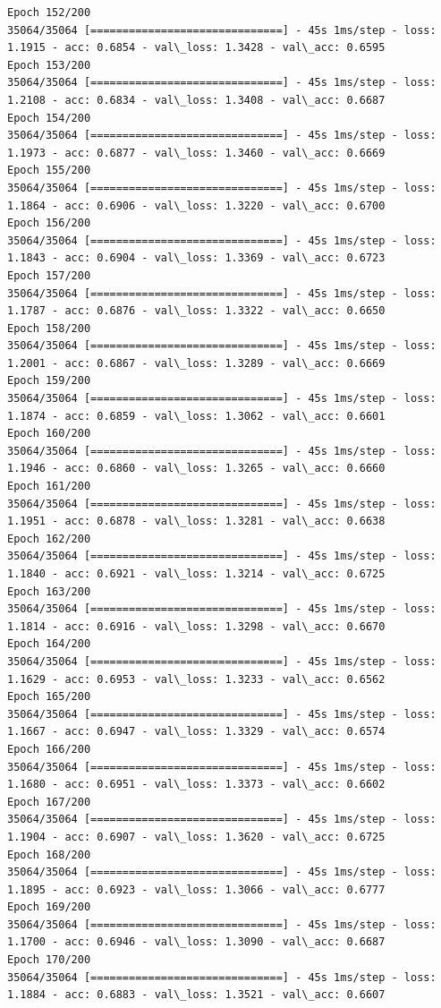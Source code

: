 \documentclass[11pt]{article}
\begin{document}
\begin{Verbatim}[commandchars=\\\{\}]
Epoch 152/200
35064/35064 [==============================] - 45s 1ms/step - loss: 1.1915 - acc: 0.6854 - val\_loss: 1.3428 - val\_acc: 0.6595
Epoch 153/200
35064/35064 [==============================] - 45s 1ms/step - loss: 1.2108 - acc: 0.6834 - val\_loss: 1.3408 - val\_acc: 0.6687
Epoch 154/200
35064/35064 [==============================] - 45s 1ms/step - loss: 1.1973 - acc: 0.6877 - val\_loss: 1.3460 - val\_acc: 0.6669
Epoch 155/200
35064/35064 [==============================] - 45s 1ms/step - loss: 1.1864 - acc: 0.6906 - val\_loss: 1.3220 - val\_acc: 0.6700
Epoch 156/200
35064/35064 [==============================] - 45s 1ms/step - loss: 1.1843 - acc: 0.6904 - val\_loss: 1.3369 - val\_acc: 0.6723
Epoch 157/200
35064/35064 [==============================] - 45s 1ms/step - loss: 1.1787 - acc: 0.6876 - val\_loss: 1.3322 - val\_acc: 0.6650
Epoch 158/200
35064/35064 [==============================] - 45s 1ms/step - loss: 1.2001 - acc: 0.6867 - val\_loss: 1.3289 - val\_acc: 0.6669
Epoch 159/200
35064/35064 [==============================] - 45s 1ms/step - loss: 1.1874 - acc: 0.6859 - val\_loss: 1.3062 - val\_acc: 0.6601
Epoch 160/200
35064/35064 [==============================] - 45s 1ms/step - loss: 1.1946 - acc: 0.6860 - val\_loss: 1.3265 - val\_acc: 0.6660
Epoch 161/200
35064/35064 [==============================] - 45s 1ms/step - loss: 1.1951 - acc: 0.6878 - val\_loss: 1.3281 - val\_acc: 0.6638
Epoch 162/200
35064/35064 [==============================] - 45s 1ms/step - loss: 1.1840 - acc: 0.6921 - val\_loss: 1.3214 - val\_acc: 0.6725
Epoch 163/200
35064/35064 [==============================] - 45s 1ms/step - loss: 1.1814 - acc: 0.6916 - val\_loss: 1.3298 - val\_acc: 0.6670
Epoch 164/200
35064/35064 [==============================] - 45s 1ms/step - loss: 1.1629 - acc: 0.6953 - val\_loss: 1.3233 - val\_acc: 0.6562
Epoch 165/200
35064/35064 [==============================] - 45s 1ms/step - loss: 1.1667 - acc: 0.6947 - val\_loss: 1.3329 - val\_acc: 0.6574
Epoch 166/200
35064/35064 [==============================] - 45s 1ms/step - loss: 1.1680 - acc: 0.6951 - val\_loss: 1.3373 - val\_acc: 0.6602
Epoch 167/200
35064/35064 [==============================] - 45s 1ms/step - loss: 1.1904 - acc: 0.6907 - val\_loss: 1.3620 - val\_acc: 0.6725
Epoch 168/200
35064/35064 [==============================] - 45s 1ms/step - loss: 1.1895 - acc: 0.6923 - val\_loss: 1.3066 - val\_acc: 0.6777
Epoch 169/200
35064/35064 [==============================] - 45s 1ms/step - loss: 1.1700 - acc: 0.6946 - val\_loss: 1.3090 - val\_acc: 0.6687
Epoch 170/200
35064/35064 [==============================] - 45s 1ms/step - loss: 1.1884 - acc: 0.6883 - val\_loss: 1.3521 - val\_acc: 0.6607

\end{Verbatim}
\end{document}
